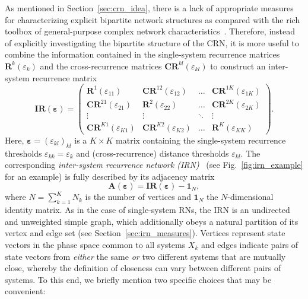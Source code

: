 \documentclass[graybox]{svmult}
\begin{document}
As mentioned in Section~\ref{sec:crn_idea}, there is a lack of appropriate measures for characterizing explicit bipartite network structures as compared with the rich toolbox of general-purpose complex network characteristics~\cite{Boccaletti2006,Costa2007}. Therefore, instead of explicitly investigating the bipartite structure of the CRN, it is more useful to combine the information contained in the single-system recurrence matrices $\mathbf{R}^k(\varepsilon_k)$ and the cross-recurrence matrices $\mathbf{CR}^{kl}(\varepsilon_{kl})$ to construct an inter-system recurrence matrix~\cite{Feldhoff2012}
\begin{equation}
\mathbf{IR}(\mathbf{\varepsilon})=\left( \begin{array}{cccc} \mathbf{R}^1(\varepsilon_{11}) & \mathbf{CR}^{12}(\varepsilon_{12}) & \hdots & \mathbf{CR}^{1K}(\varepsilon_{1K}) \\
\mathbf{CR}^{21}(\varepsilon_{21}) & \mathbf{R}^2(\varepsilon_{22}) & \hdots & \mathbf{CR}^{2K}(\varepsilon_{2K}) \\
\vdots & \vdots & \ddots & \vdots \\ \mathbf{CR}^{K1}(\varepsilon_{K1}) & \mathbf{CR}^{K2}(\varepsilon_{K2}) & \hdots & \mathbf{R}^K(\varepsilon_{KK}) \end{array} \right).
\label{isrm}
\end{equation}
Here, $\mathbf{\varepsilon}=(\varepsilon_{kl})_{kl}$ is a $K \times K$ matrix containing the single-system recurrence thresholds $\varepsilon_{kk}=\varepsilon_k$ and (cross-recurrence) distance thresholds $\varepsilon_{kl}$. The corresponding \emph{inter-system recurrence network (IRN)}~\cite{Feldhoff2012} (see Fig.~\ref{fig:irn_example} for an example) is fully described by its adjacency matrix
\begin{equation}
\mathbf{A}(\mathbf{\varepsilon})=\mathbf{IR}(\mathbf{\varepsilon}) - \mathbf{1}_N,
\end{equation}
where $N=\sum_{k=1}^K N_k$ is the number of vertices and $\mathbf{1}_N$ the $N$-dimensional identity matrix. As in the case of single-system RNs, the IRN is an undirected and unweighted simple graph, which additionally obeys a natural partition of its vertex and edge set (see Section~\ref{sec:irn_measures}). Vertices represent state vectors in the phase space common to all systems $X_k$ and edges indicate pairs of state vectors from \emph{either} the same \emph{or} two different systems that are mutually close, whereby the definition of closeness can vary between different pairs of systems. To this end, we briefly mention two specific choices that may be convenient:
\end{document}
